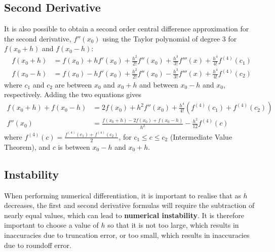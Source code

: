 \documentclass{article}
\begin{document}
\subsection{Second Derivative}
It is also possible to obtain a second order central difference
approximation for the second derivative, \(f''\left( x_0 \right)\)
using the Taylor polynomial of degree 3 for \(f\left( x_0 + h \right)\)
and \(f\left( x_0 - h \right)\):
\begin{align*}
    f\left( x_0 + h \right) & = f\left( x_0 \right) + h f'\left( x_0 \right) + \frac{h^2}{2!} f''\left( x_0 \right) + \frac{h^3}{3!} f'''\left( x \right) + \frac{h^4}{4!} f^{\left( 4 \right)}\left( c_1 \right) \\
    f\left( x_0 - h \right) & = f\left( x_0 \right) - h f'\left( x_0 \right) + \frac{h^2}{2!} f''\left( x_0 \right) - \frac{h^3}{3!} f'''\left( x \right) + \frac{h^4}{4!} f^{\left( 4 \right)}\left( c_2 \right)
\end{align*}
where \(c_1\) and \(c_2\) are between \(x_0\) and \(x_0 + h\) and
between \(x_0 - h\) and \(x_0\), respectively. Adding the two equations
gives
\begin{align*}
    f\left( x_0 + h \right) + f\left( x_0 - h \right) & = 2f\left( x_0 \right) + h^2 f''\left( x_0 \right) + \frac{h^4}{4!} \left( f^{\left( 4 \right)}\left( c_1 \right) + f^{\left( 4 \right)}\left( c_2 \right) \right) \\
    f''\left( x_0 \right)                             & = \frac{f\left( x_0 + h \right) - 2f\left( x_0 \right) + f\left( x_0 - h \right)}{h^2} - \frac{h^2}{12} f^{\left( 4 \right)}\left( c \right)
\end{align*}
where \(f^{\left( 4 \right)}\left( c \right) =
\frac{f^{\left( 4 \right)}\left( c_1 \right) +
    f^{\left( 4 \right)}\left( c_2 \right)}{2}\), for
\(c_1 \leq c \leq c_2\) (Intermediate Value Theorem), and \(c\) is
between \(x_0 - h\) and \(x_0 + h\).
\subsection{Instability}
When performing numerical differentiation, it is important to realise
that as \(h\) decreases, the first and second derivative formulas will
require the subtraction of nearly equal values, which can lead to
\textbf{numerical instability}. It is therefore important to choose a
value of \(h\) so that it is not too large, which results in
inaccuracies due to truncation error, or too small, which results in
inaccuracies due to roundoff error.
\end{document}

